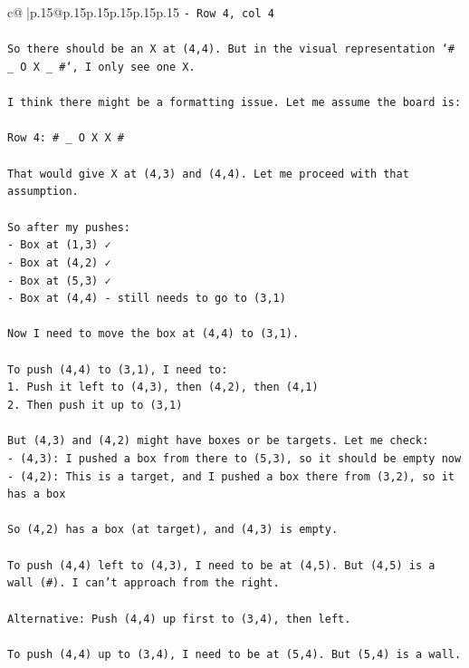 \documentclass{article}
\begin{document}
{\begin{supertabular}{c@{$\;$}|p{.15\linewidth}@{}p{.15\linewidth}p{.15\linewidth}p{.15\linewidth}p{.15\linewidth}p{.15\linewidth}}
{{{\texttt{{-} Row 4, col 4} \\
\\ 
\texttt{So there should be an X at (4,4). But in the visual representation `\# \_ O X \_ \#`, I only see one X.} \\
\\ 
\texttt{I think there might be a formatting issue. Let me assume the board is:} \\
\\ 
\texttt{Row 4: \# \_ O X X \#} \\
\\ 
\texttt{That would give X at (4,3) and (4,4). Let me proceed with that assumption.} \\
\\ 
\texttt{So after my pushes:} \\
\texttt{{-} Box at (1,3) ✓} \\
\texttt{{-} Box at (4,2) ✓} \\
\texttt{{-} Box at (5,3) ✓} \\
\texttt{{-} Box at (4,4) {-} still needs to go to (3,1)} \\
\\ 
\texttt{Now I need to move the box at (4,4) to (3,1). } \\
\\ 
\texttt{To push (4,4) to (3,1), I need to:} \\
\texttt{1. Push it left to (4,3), then (4,2), then (4,1)} \\
\texttt{2. Then push it up to (3,1)} \\
\\ 
\texttt{But (4,3) and (4,2) might have boxes or be targets. Let me check:} \\
\texttt{{-} (4,3): I pushed a box from there to (5,3), so it should be empty now} \\
\texttt{{-} (4,2): This is a target, and I pushed a box there from (3,2), so it has a box} \\
\\ 
\texttt{So (4,2) has a box (at target), and (4,3) is empty.} \\
\\ 
\texttt{To push (4,4) left to (4,3), I need to be at (4,5). But (4,5) is a wall (\#). I can't approach from the right.} \\
\\ 
\texttt{Alternative: Push (4,4) up first to (3,4), then left.} \\
\\ 
\texttt{To push (4,4) up to (3,4), I need to be at (5,4). But (5,4) is a wall.} \\
}}}
\end{supertabular}}
\end{document}
